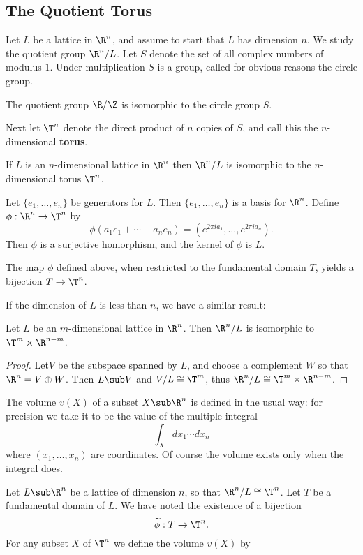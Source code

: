 \subsection{The Quotient Torus}
Let $L$ be a lattice in $\R^n$, and assume to start that $L$ has dimension $n$. We study the quotient group $\R^n/L$.
Let $S$ denote the set of all complex numbers of modulus $1$. Under multiplication $S$ is a group, called for obvious reasons the circle group.
\begin{lemma}
The quotient group $\R/\Z$ is isomorphic to the circle group $S$.
\end{lemma}
Next let $\T^n$ denote the direct product of $n$ copies of $S$, and call this the
$n$-dimensional \textbf{torus}.
\begin{theorem}
If $L$ is an $n$-dimensional lattice in $\R^n$ then $\R^n/L$ is isomorphic to the $n$-dimensional torus $\T^n$.
\end{theorem}
\begin{lemma}
Let $\{e_1,\dots,e_n\}$ be generators for $L$. Then $\{e_1,\dots,e_n\}$ is a basis for $\R^n$. Define $\phi:\R^n\to\T^n$ by
\[\phi(a_1e_1+\cdots+a_ne_n)=(e^{2\pi i a_1},\dots,e^{2\pi ia_n}).\]
Then $\phi$ is a surjective homorphism, and the kernel of $\phi$ is $L$.
\end{lemma}
\begin{lemma}
The map $\phi$ defined above, when restricted to the fundamental domain $T$, yields a bijection $T\to\T^n$.
\end{lemma}
If the dimension of $L$ is less than $n$, we have a similar result:
\begin{theorem}
Let $L$ be an $m$-dimensional lattice in $\R^n$. Then $\R^n/L$ is isomorphic to $\T^m\times\R^{n-m}$.
\end{theorem}
\begin{proof}
Let$ V$ be the subspace spanned by $L$, and choose a complement $W$ so that $\R^n=V\oplus W$. Then $L\sub V$ and $V/L\cong\T^m$, thus $\R^n/L\cong \T^m\times\R^{n-m}$.
\end{proof}
The volume $v(X)$ of a subset $X\sub\R^n$ is defined in the usual way: for precision we take it to be the value of the multiple integral
\[\int_Xdx_1\cdots dx_n\]
where $(x_1,\dots,x_n)$ are coordinates. Of course the volume exists only when
the integral does.\par
Let $L\sub\R^n$ be a lattice of dimension $n$, so that $\R^n/L\cong\T^n$. Let $T$ be a fundamental domain of $L$. We have noted the existence of a bijection
\[\widetilde{\phi}:T\to\T^n.\]
For any subset $X$ of $\T^n$ we define the volume $v(X)$ by

